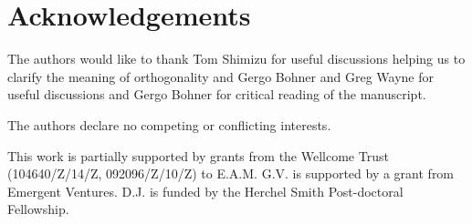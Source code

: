 
\section*{Acknowledgements}
The authors would like to thank Tom Shimizu for useful discussions helping us to clarify the meaning of orthogonality and Gergo Bohner and Greg Wayne for useful discussions and Gergo Bohner for critical reading of the manuscript.

\vspace{2mm}
The authors declare no competing or conflicting interests.

\vspace{2mm}
This work is partially supported by grants from the Wellcome Trust (104640/Z/14/Z, 092096/Z/10/Z) to E.A.M.  G.V. is supported by a grant from Emergent Ventures.  D.J. is funded by the Herchel Smith Post-doctoral Fellowship.  